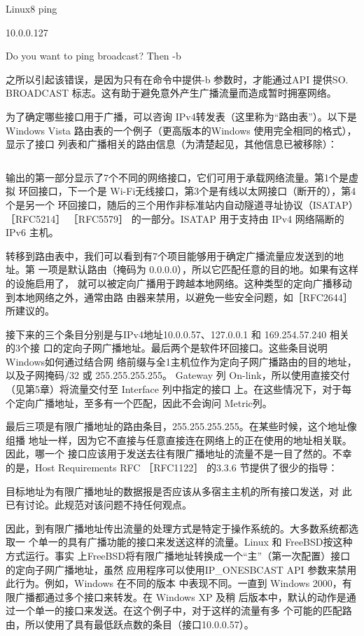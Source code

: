 Linux8 ping

10.0.0.127

Do you want to ping broadcast? Then -b

之所以引起该错误，是因为只有在命令中提供-b 参数时，才能通过API 提供SO.
BROADCAST
标志。这有助于避免意外产生广播流量而造成暂时拥塞网络。

为了确定哪些接口用于广播，可以咨询 IPv4转发表（这里称为“路由表”）。以下是
Windows Vista 路由表的一个例子（更高版本的Windows 使用完全相同的格式），显示了接口
列表和广播相关的路由信息（为清楚起见，其他信息已被移除）：

\begin{verbatim}

\end{verbatim}

输出的第一部分显示了7个不同的网络接口，它们可用于承载网络流量。第1个是虚拟
环回接口，下一个是 Wi-Fi无线接口，第3个是有线以太网接口（断开的），第4个是另一个
环回接口，随后的三个用作非标准站内自动隧道寻址协议（ISATAP）［RFC5214］ ［RFC5579］
的一部分。ISATAP 用于支持由 IPv4 网络隔断的IPv6 主机。

转移到路由表中，我们可以看到有7个项目能够用于确定广播流量应发送到的地址。第
一项是默认路由（掩码为 0.0.0.0），所以它匹配任意的目的地。如果有这样的设施启用了，
就可以被定向广播用于跨越本地网络。这种类型的定向广播移动到本地网络之外，通常由路
由器来禁用，以避免一些安全问题，如［RFC2644］所建议的。

接下来的三个条目分别是与IPv4地址10.0.0.57、127.0.0.1 和 169.254.57.240 相关的3个接
口的定向子网广播地址。最后两个是软件环回接口。这些条目说明Windows如何通过结合网
络前缀与全1主机位作为定向子网广播路由的目的地址，以及子网掩码/32 或 255.255.255.255。
Gateway 列 On-link，所以使用直接交付（见第5章）将流量交付至 Interface 列中指定的接口
上。在这些情况下，对于每个定向广播地址，至多有一个匹配，因此不会询问 Metric列。

最后三项是有限广播地址的路由条目，255.255.255.255。在某些时候，这个地址像组播
地址一样，因为它不直接与任意直接连在网络上的正在使用的地址相关联。因此，哪一个
接口应该用于发送去往有限广播地址的流量不是一目了然的。不幸的是，Host Requirements
RFC ［RFC1122］ 的3.3.6 节提供了很少的指导：

目标地址为有限广播地址的数据报是否应该从多宿主主机的所有接口发送，对
此已有讨论。此规范对该问题不持任何观点。

因此，到有限广播地址传出流量的处理方式是特定于操作系统的。大多数系统都选取一
个单一的具有广播功能的接口来发送这样的流量。Linux 和 FreeBSD按这种方式运行。事实
上FreeBSD将有限广播地址转换成一个“主”（第一次配置）接口的定向子网广播地址，虽然
应用程序可以使用IP\_ONESBCAST API 参数来禁用此行为。例如，Windows 在不同的版本
中表现不同。一直到 Windows 2000，有限广播都通过多个接口来转发。在 Windows XP 及稍
后版本中，默认的动作是通过一个单一的接口来发送。在这个例子中，对于这样的流量有多
个可能的匹配路由，所以使用了具有最低跃点数的条目（接口10.0.0.57）。


